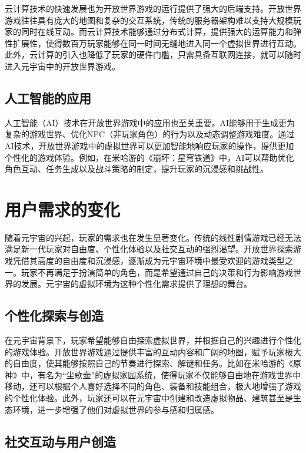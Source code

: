 \documentclass[UTF8]{ctexart}
\begin{document}
云计算技术的快速发展也为开放世界游戏的运行提供了强大的后端支持。开放世界游戏往往具有庞大的地图和复杂的交互系统，传统的服务器架构难以支持大规模玩家的同时在线互动。而云计算技术能够通过分布式计算，提供强大的运算能力和弹性扩展性，使得数百万玩家能够在同一时间无缝地进入同一个虚拟世界进行互动。此外，云计算的引入也降低了玩家的硬件门槛，只需具备互联网连接，就可以随时进入元宇宙中的开放世界游戏。

\subsection{人工智能的应用}

人工智能（AI）技术在开放世界游戏中的应用也至关重要。AI能够用于生成更为复杂的游戏世界、优化NPC（非玩家角色）的行为以及动态调整游戏难度。通过AI技术，开放世界游戏中的虚拟世界可以更加智能地响应玩家的操作，提供更加个性化的游戏体验。例如，在米哈游的《崩坏：星穹铁道》中，AI可以帮助优化角色互动、任务生成以及战斗策略的制定，提升玩家的沉浸感和挑战性\cite{grigore2021vrgames}。


	
	\section{用户需求的变化}
	
	随着元宇宙的兴起，玩家的需求也在发生显著变化。传统的线性剧情游戏已经无法满足新一代玩家对自由度、个性化体验以及社交互动的强烈渴望。开放世界探索游戏凭借其高度的自由度和沉浸感，逐渐成为元宇宙环境中最受欢迎的游戏类型之一\cite{silva2022gamerneeds}。玩家不再满足于扮演简单的角色，而是希望通过自己的决策和行为影响游戏世界的发展。元宇宙的虚拟环境为这种个性化需求提供了理想的舞台。
	
	\subsection{个性化探索与创造}
	
	在元宇宙背景下，玩家希望能够自由探索虚拟世界，并根据自己的兴趣进行个性化的游戏体验\cite{cavus2021userexperience}。开放世界游戏通过提供丰富的互动内容和广阔的地图，赋予玩家极大的自由度，使其能够按照自己的节奏进行探索、解谜和任务。比如在米哈游的《原神》中，有名为“尘歌壶”的虚拟家园系统，使得玩家不仅能够自由地在游戏世界中移动，还可以根据个人喜好选择不同的角色、装备和技能组合，极大地增强了游戏的个性化体验。此外，玩家还可以在元宇宙中创建和改造虚拟物品、建筑甚至是生态环境，进一步增强了他们对虚拟世界的参与感和归属感。
	
	
	\subsection{社交互动与用户创造}
	
\end{document}
